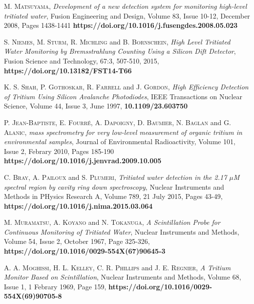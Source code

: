 \begin{thebibliography}{100}
 \textsc{M. Matsuyama},
\textit{Development of a new detection system for monitoring high-level tritiated water}, Fusion Engineering and Design, Volume 83, Issue 10-12, December 2008, Pages 1438-1441 \textbf{https://doi.org/10.1016/j.fusengdes.2008.05.023}

 \textsc{S. Niemes}, \textsc{M. Sturm}, \textsc{R. Michling} and \textsc{B. Bornschein},
\textit{High Level Tritiated Water Monitoring by Bremsstrahlung Counting Using a Silicon Dift Detector}, Fusion Science and Technology, 67:3, 507-510, 2015, \textbf{https://doi.org/10.13182/FST14-T66}

 \textsc{K. S. Shah}, \textsc{P. Gothoskar}, \textsc{R. Farrell} and \textsc{J. Gordon},
\textit{High Efficiency Detection of Tritium Using Silicon Avalanche Photodiodes}, IEEE Transactions on Nuclear Science, Volume 44, Issue 3, June 1997, \textbf{10.1109/23.603750}

 \textsc{P. Jean-Baptiste}, \textsc{E. Fourré}, \textsc{A. Dapoigny}, \textsc{D. Baumier}, \textsc{N. Baglan} and \textsc{G. Alanic},
\textit{ mass spectrometry for very low-level measurement of organic tritium in environmental samples}, Journal of Environmental Radioactivity, Volume 101, Issue 2, Febrary 2010, Pages 185-190 \textbf{https://doi.org/10.1016/j.jenvrad.2009.10.005} 

 \textsc{C. Bray}, \textsc{A. Pailoux} and \textsc{S. Plumeri},
\textit{Tritiated water detection in the 2.17 $\mu$M spectral region by cavity ring down spectroscopy},  Nuclear Instruments and Methods in PHysics Research A, Volume 789, 21 July 2015, Pages 43-49, \textbf{https://doi.org/10.1016/j.nima.2015.03.064} 

 \textsc{M. Muramatsu}, \textsc{A. Koyano} and \textsc{N. Tokanuga},
\textit{A Scintillation Probe for Continuous Monitoring of Tritiated Water}, Nuclear Instruments and Methods, Volume 54, Issue 2, October 1967, Page 325-326, \textbf{https://doi.org/10.1016/0029-554X(67)90645-3}

 \textsc{A. A. Moghissi}, \textsc{H. L. Kelley}, \textsc{C. R. Phillips} and \textsc{J. E. Regnier},
\textit{A Tritium Monitor Based on Scintillation}, Nuclear Instruments and Methods, Volume 68, Issue 1, 1 Febrary 1969, Page 159, \textbf{https://doi.org/10.1016/0029-554X(69)90705-8}


\end{thebibliography}
